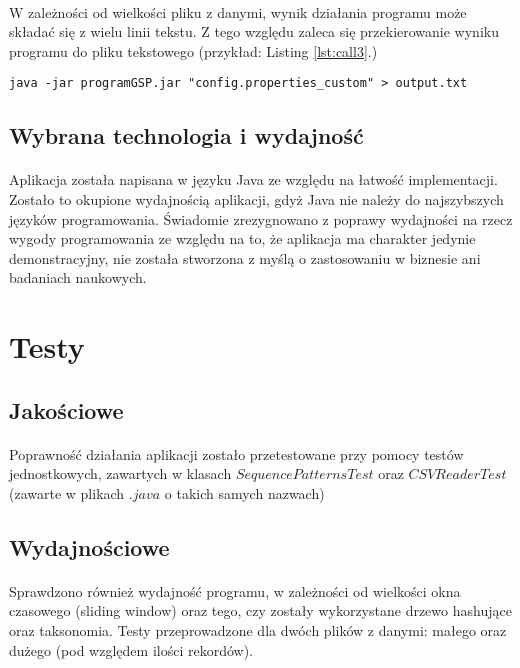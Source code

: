 \documentclass[11pt,a4paper]{article}
\begin{document}
\paragraph{} W zależności od wielkości pliku z danymi, wynik działania programu może składać się z wielu linii tekstu. Z tego względu zaleca się przekierowanie wyniku programu do pliku tekstowego (przykład: Listing \ref{lst:call3}.)
\begin{lstlisting}[caption={Wywołanie dla domyślnego pliku konfiguracyjnego},label={lst:call3}]
java -jar programGSP.jar "config.properties_custom" > output.txt
\end{lstlisting}
\subsection{Wybrana technologia i wydajność}
\paragraph{} Aplikacja została napisana w języku Java ze względu na łatwość implementacji. Zostało to okupione wydajnością aplikacji, gdyż Java nie należy do najszybszych języków programowania. Świadomie zrezygnowano z poprawy wydajności na rzecz wygody programowania ze względu na to, że aplikacja ma charakter jedynie demonstracyjny, nie została stworzona z myślą o zastosowaniu w biznesie ani badaniach naukowych.

\section{Testy}
\subsection{Jakościowe}
\paragraph{} Poprawność działania aplikacji zostało przetestowane przy pomocy testów jednostkowych, zawartych w klasach $SequencePatternsTest$ oraz $CSVReaderTest$ (zawarte w plikach $.java$ o takich samych nazwach)
\subsection{Wydajnościowe}
\paragraph{} Sprawdzono również wydajność programu, w zależności od wielkości okna czasowego (sliding window) oraz tego, czy zostały wykorzystane drzewo hashujące oraz taksonomia. Testy przeprowadzone dla dwóch plików z danymi: małego oraz dużego (pod względem ilości rekordów).
\end{document}
